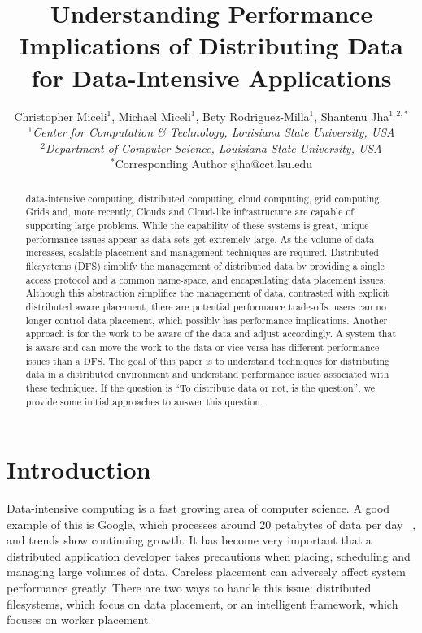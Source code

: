 \documentclass{rspublic}
\title[Understanding Performance Implications of Distributing Data for
Data-Intensive Applications]{Understanding Performance Implications of
Distributing Data for Data-Intensive Applications}
\author[Miceli, Miceli, Rodriguez-Milla, Jha]{ Christopher Miceli$^{1}$,
Michael Miceli$^{1}$, Bety Rodriguez-Milla$^{1}$, Shantenu Jha$^{1,2,*}$
\\ \small{\emph{$^{1}$Center for Computation \& Technology, Louisiana
State University, USA}} \\  \small{\emph{$^{2}$Department of Computer
Science, Louisiana State University, USA}} \\ {\footnotesize
{\hspace{0.0 in} $^*$Corresponding Author sjha@cct.lsu.edu}} }
\begin{document}
 \maketitle


\begin{abstract}{data-intensive computing, distributed computing,
    cloud computing, grid computing} Grids and, more recently, Clouds
  and Cloud-like infrastructure are capable of supporting large
  problems.  While the capability of these systems is great, unique
  performance issues appear as data-sets get extremely large.  As the
  volume of data increases, scalable placement and management
  techniques are required.   Distributed filesystems (DFS)
  simplify the management of distributed data by providing a single
  access protocol and a common name-space, and encapsulating data
  placement issues.  Although this abstraction simplifies the
  management of data, contrasted with explicit distributed aware
  placement, there are potential performance trade-offs: users can no
  longer control data placement, which possibly has performance
  implications.  Another approach is for the work to be aware of the
  data and adjust accordingly.  A system that is aware and can move
  the work to the data or vice-versa has different performance issues
  than a DFS. The goal of this paper is to understand techniques for
  distributing data in a distributed environment and understand
  performance issues associated with these techniques.  If the
  question is ``To distribute data or not, is the question'', we
  provide some initial approaches to answer this question.
  \end{abstract}

\section{Introduction} Data-intensive computing is a fast growing area
of computer science.  A good example of this is Google, which processes
around 20 petabytes of data per day ~\citep{google}, and trends show
continuing growth.  It has become very important that a distributed
application developer takes precautions when placing, scheduling and
managing large volumes of data.  Careless placement can adversely affect
system performance greatly.  There are two ways to handle this issue:
distributed filesystems, which focus on data placement, or an
intelligent framework, which focuses on worker placement.
\end{document}

